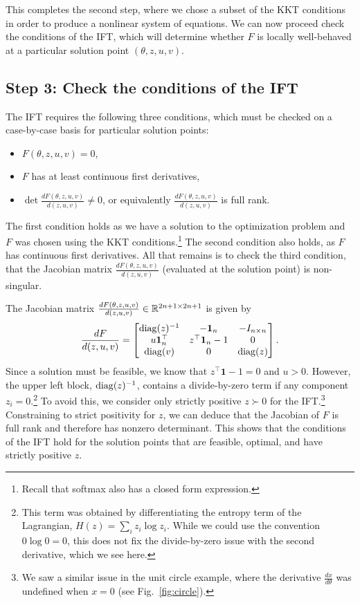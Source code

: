 \documentclass[11pt]{article}
\begin{document}
This completes the second step, where we chose a subset of the KKT conditions
in order to produce a nonlinear system of equations.
We can now proceed check the conditions of the IFT,
which will determine whether $F$ is locally well-behaved
at a particular solution point $(\theta, z,u,v)$.

\subsection*{Step 3: Check the conditions of the IFT}
The IFT requires the following three conditions,
which must be checked on a case-by-case basis for particular
solution points:
\begin{itemize}
    \item $F(\theta,z,u,v) = 0$,
    \item $F$ has at least continuous first derivatives,
    \item $\det\frac{dF(\theta,z,u,v)}{d(z,u,v)} \ne 0$,
        or equivalently $\frac{dF(\theta,z,u,v)}{d(z,u,v)}$
        is full rank.
\end{itemize}
The first condition holds as we have a solution to the optimization problem
and $F$ was chosen using the KKT conditions.\footnote{
Recall that softmax also has a closed form expression.}
The second condition also holds, as $F$ has continuous first derivatives.
All that remains is to check the third condition,
that the Jacobian matrix $\frac{dF(\theta,z,u,v)}{d(z,u,v)}$
(evaluated at the solution point) is non-singular.

The Jacobian matrix $\frac{dF(\theta,z,u,v)}{d(z,u,v)}\in\mathbb{R}^{2n+1\times 2n+1}$ is given by
\begin{equation}
\label{eqn:f-jac}
\frac{dF}{d(z,u,v)}=
\begin{bmatrix}
\mathrm{diag}(z)^{-1} & -\mathbf{1}_n & -I_{n\times n} \\
u\mathbf{1}_n^\top & z^\top\mathbf{1}_n - 1 & 0\\
\mathrm{diag}(v) & 0 & \mathrm{diag}(z)
\end{bmatrix}.
\end{equation}
Since a solution must be feasible, we know that $z^\top\mathbf{1}-1=0$ and $u > 0$.
However, the upper left block, $\mathrm{diag}(z)^{-1}$, contains a divide-by-zero term if
any component $z_i = 0$.\footnote{
This term was obtained by differentiating the entropy
term of the Lagrangian, $H(z) = \sum_i z_i\log z_i$.
While we could use the convention $0\log 0 = 0$,
this does not fix the divide-by-zero issue with the second derivative, which we see here.
}
To avoid this, we consider only strictly positive $z \succ 0$ for the IFT.\footnote{
We saw a similar issue in the unit circle example, where the derivative
$\frac{dx}{d\theta}$ was undefined when $x=0$ (see Fig.~\ref{fig:circle}).
}
Constraining to strict positivity for $z$,
we can deduce that the Jacobian of $F$ is full rank and therefore has nonzero determinant.
This shows that the conditions of the IFT hold for the solution points that are
feasible, optimal, and have strictly positive $z$.
\end{document}
